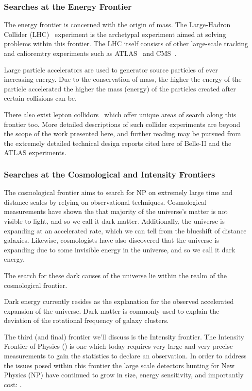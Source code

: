 \subsubsection{Searches at the Energy Frontier}
The energy frontier is concerned with the origin of mass.
The Large-Hadron Collider (LHC)~\citep{higgs_discovery_20121} experiment is the archetypal experiment aimed at solving problems within this frontier.
The LHC itself consists of other large-scale tracking and calioremtry experiments such as ATLAS~\citep{ATLAS:1999vwa} and CMS~\citep{CMS:2006myw}.

Large particle accelerators are used to generator source particles of ever increasing energy.
Due to the conservation of mass, the higher the energy of the particle accelerated the higher the mass (energy) of the particles created after certain collisions can be.

There also exist lepton collidors~\citep{belle2_tdr_arxiv} which offer unique areas of search along this frontier too.
More detailed descriptions of such collider experiments are beyond the scope of the work presented here, and further reading may be pursued from the extremely detailed technical design reports cited here of Belle-II and the ATLAS experiments.

\subsubsection{Searches at the Cosmological and Intensity Frontiers}
The cosmological frontier aims to search for NP on extremely large time and distance scales by relying on observational techniques.
Cosmological measurements have shown the that majority of the universe's matter is not visible to light, and so we call it dark matter.
Additionally, the universe is expanding at an accelerated rate, which we can tell from the blueshift of distance galaxies.
Likewise, cosmologists have also discovered that the universe is expanding due to some invisible energy in the universe, and so we call it dark energy.

The search for these dark causes of the universe lie within the realm of the cosmological frontier.

Dark energy currently resides as the explanation for the observed accelerated expansion of the universe.
Dark matter is commonly used to explain the deviation of the rotational frequency of galaxy clusters.

The third (and final) frontier we'll discuss is the Intensity frontier.
The Intensity Frontier of Physics (\citep{intensityfrontier2012_Hewett}) is one which today requires very large and very precise measurements to gain the statistics to declare an observation.
In order to address the issues posed within this frontier the large scale detectors hunting for New Physics (NP) have continued to grow in size, energy sensitivity, and importantly cost: \citep{Juno:2022103927}.

